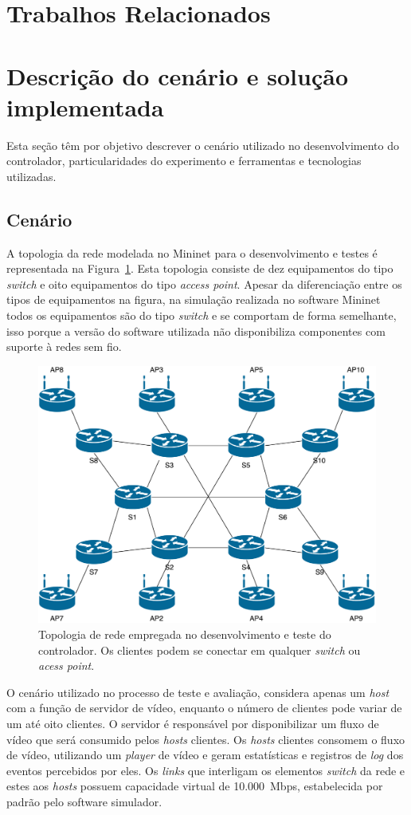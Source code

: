 \documentclass[12pt]{article}
\begin{document}
\section{Trabalhos Relacionados}

\section{Descrição do cenário e solução implementada}
Esta seção têm por objetivo descrever o cenário utilizado no desenvolvimento do controlador, particularidades do experimento e ferramentas e tecnologias utilizadas.

\subsection{Cenário}
A topologia da rede modelada no Mininet para o desenvolvimento e testes é representada na Figura~\ref{fig:topology}. Esta topologia consiste de dez equipamentos do tipo \emph{switch} e oito equipamentos do tipo \emph{access point}. Apesar da diferenciação entre os tipos de equipamentos na figura, na simulação realizada no software Mininet todos os equipamentos são do tipo \emph{switch} e se comportam de forma semelhante, isso porque a versão do software utilizada não disponibiliza componentes com suporte à redes sem fio.

\begin{figure}[ht]
\centering
\includegraphics[width=.60\textwidth]{figures/scenario.pdf}
\caption{Topologia de rede empregada no desenvolvimento e teste do controlador. Os clientes podem se conectar em qualquer \emph{switch} ou \emph{acess point}.}
\label{fig:topology}
\end{figure}

O cenário utilizado no processo de teste e avaliação, considera apenas um \emph{host} com a função de servidor de vídeo, enquanto o número de clientes pode variar de um até oito clientes. O servidor é responsável por disponibilizar um fluxo de vídeo que será consumido pelos \emph{hosts} clientes. Os \emph{hosts} clientes consomem o fluxo de vídeo, utilizando um \emph{player} de vídeo e geram estatísticas e registros de \emph{log} dos eventos percebidos por eles. Os \emph{links} que interligam os elementos \emph{switch} da rede e estes aos \emph{hosts} possuem capacidade virtual de 10.000~Mbps, estabelecida por padrão pelo software simulador.
\end{document}
